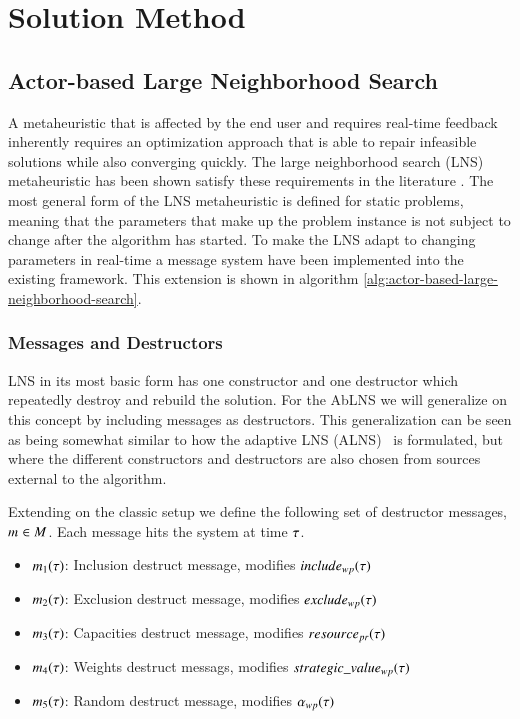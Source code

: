 \section{Solution Method}
\label{sec:2-solution-method}

\subsection{Actor-based Large Neighborhood Search}
A metaheuristic that is affected by the end user and requires real-time feedback
inherently requires an optimization approach that is able to repair infeasible solutions
while also converging quickly. The large neighborhood search (LNS)~\cite{shaw1998using}
metaheuristic has been shown satisfy these requirements in the literature
\cite{gendreauHandbookMetaheuristics2019}. The most general form of the LNS metaheuristic
is defined for static problems, meaning that the parameters that make up the problem instance
is not subject to change after the algorithm has started. To make the
LNS adapt to changing parameters in real-time a message system have been
implemented into the existing framework. This  extension is shown in algorithm
\ref{alg:actor-based-large-neighborhood-search}.

\subsubsection{Messages and Destructors}
LNS in its most basic form has one constructor and one destructor which
repeatedly destroy and rebuild the solution. For the AbLNS we will generalize
on this concept by including messages as destructors. This generalization can
be seen as being somewhat similar to how
the adaptive LNS (ALNS)~\cite{pisinger2007general} is formulated, but where the different constructors and
destructors are also chosen from sources external to the algorithm.

Extending on the classic setup we define the following set of 
destructor messages, $m_{}^{} \in M$. Each
message hits the system at time $\tau$.

\begin{itemize}
	\item $m_1(\tau)$: Inclusion destruct message, modifies $include_{wp}(\tau)$	
	\item $m_2(\tau)$: Exclusion destruct message, modifies $exclude_{wp}(\tau)$
	\item $m_3(\tau)$: Capacities destruct message, modifies $\ParStrategicResource$
	\item $m_4(\tau)$: Weights destruct messags, modifies $strategic\_value_{w p}(\tau)$
	\item $m_5(\tau)$: Random destruct message, modifies $\alpha_{wp}(\tau)$
\end{itemize}

